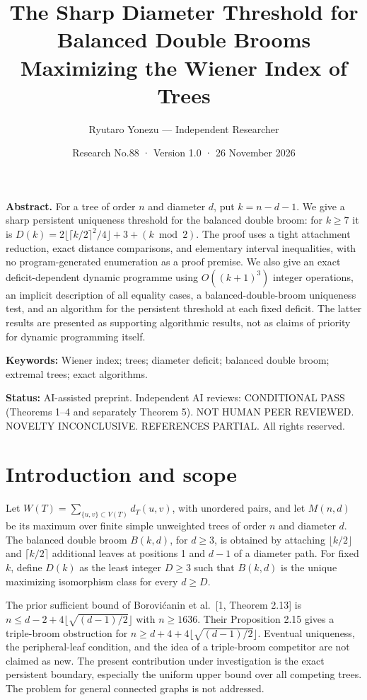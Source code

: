 \documentclass[
  10pt,
  a4paper,
]{article}
\title{The Sharp Diameter Threshold for Balanced Double Brooms
Maximizing the Wiener Index of Trees}
\author{Ryutaro Yonezu --- Independent Researcher}
\date{Research No.88 · Version 1.0 · 26 November 2026}
\begin{document}
\maketitle

\textbf{Abstract.} For a tree of order \(n\) and diameter \(d\), put
\(k=n-d-1\). We give a sharp persistent uniqueness threshold for the
balanced double broom: for \(k\ge7\) it is
\(D(k)=2\lfloor\lceil k/2\rceil^2/4\rfloor+3+(k\bmod2)\). The proof uses
a tight attachment reduction, exact distance comparisons, and elementary
interval inequalities, with no program-generated enumeration as a proof
premise. We also give an exact deficit-dependent dynamic programme using
\(O((k+1)^3)\) integer operations, an implicit description of all
equality cases, a balanced-double-broom uniqueness test, and an
algorithm for the persistent threshold at each fixed deficit. The latter
results are presented as supporting algorithmic results, not as claims
of priority for dynamic programming itself.

\textbf{Keywords:} Wiener index; trees; diameter deficit; balanced
double broom; extremal trees; exact algorithms.

\textbf{Status:} AI-assisted preprint. Independent AI reviews:
CONDITIONAL PASS (Theorems 1--4 and separately Theorem 5). NOT HUMAN
PEER REVIEWED. NOVELTY INCONCLUSIVE. REFERENCES PARTIAL. All rights
reserved.

\section{Introduction and scope}\label{introduction-and-scope}

Let \(W(T)=\sum_{\{u,v\}\subset V(T)}d_T(u,v)\), with unordered pairs,
and let \(M(n,d)\) be its maximum over finite simple unweighted trees of
order \(n\) and diameter \(d\). The balanced double broom \(B(k,d)\),
for \(d\ge3\), is obtained by attaching \(\lfloor k/2\rfloor\) and
\(\lceil k/2\rceil\) additional leaves at positions 1 and \(d-1\) of a
diameter path. For fixed \(k\), define \(D(k)\) as the least integer
\(D\ge3\) such that \(B(k,d)\) is the unique maximizing isomorphism
class for every \(d\ge D\).

The prior sufficient bound of Borovićanin et al.~{[}1, Theorem 2.13{]}
is \(n\le d-2+4\lfloor\sqrt{(d-1)/2}\rfloor\) with \(n\ge1636\). Their
Proposition 2.15 gives a triple-broom obstruction for
\(n\ge d+4+4\lfloor\sqrt{(d-1)/2}\rfloor\). Eventual uniqueness, the
peripheral-leaf condition, and the idea of a triple-broom competitor are
not claimed as new. The present contribution under investigation is the
exact persistent boundary, especially the uniform upper bound over all
competing trees. The problem for general connected graphs is not
addressed.
\end{document}
